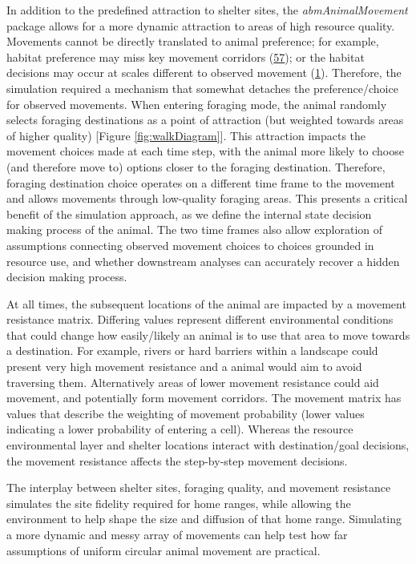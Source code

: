 \documentclass[10pt,a4paper]{article}
\begin{document}
In addition to the predefined attraction to shelter sites, the \emph{abmAnimalMovement} package allows for a more dynamic attraction to areas of high resource quality.
Movements cannot be directly translated to animal preference; for example, habitat preference may miss key movement corridors (\protect\hyperlink{ref-Scharf2018}{57}); or the habitat decisions may occur at scales different to observed movement (\protect\hyperlink{ref-Bastille-Rousseau2017}{1}).
Therefore, the simulation required a mechanism that somewhat detaches the preference/choice for observed movements.
When entering foraging mode, the animal randomly selects foraging destinations as a point of attraction (but weighted towards areas of higher quality) {[}Figure \ref{fig:walkDiagram}{]}.
This attraction impacts the movement choices made at each time step, with the animal more likely to choose (and therefore move to) options closer to the foraging destination.
Therefore, foraging destination choice operates on a different time frame to the movement and allows movements through low-quality foraging areas.
This presents a critical benefit of the simulation approach, as we define the internal state decision making process of the animal.
The two time frames also allow exploration of assumptions connecting observed movement choices to choices grounded in resource use, and whether downstream analyses can accurately recover a hidden decision making process.

At all times, the subsequent locations of the animal are impacted by a movement resistance matrix.
Differing values represent different environmental conditions that could change how easily/likely an animal is to use that area to move towards a destination.
For example, rivers or hard barriers within a landscape could present very high movement resistance and a animal would aim to avoid traversing them.
Alternatively areas of lower movement resistance could aid movement, and potentially form movement corridors.
The movement matrix has values that describe the weighting of movement probability (lower values indicating a lower probability of entering a cell).
Whereas the resource environmental layer and shelter locations interact with destination/goal decisions, the movement resistance affects the step-by-step movement decisions.

The interplay between shelter sites, foraging quality, and movement resistance simulates the site fidelity required for home ranges, while allowing the environment to help shape the size and diffusion of that home range.
Simulating a more dynamic and messy array of movements can help test how far assumptions of uniform circular animal movement are practical.
\end{document}
